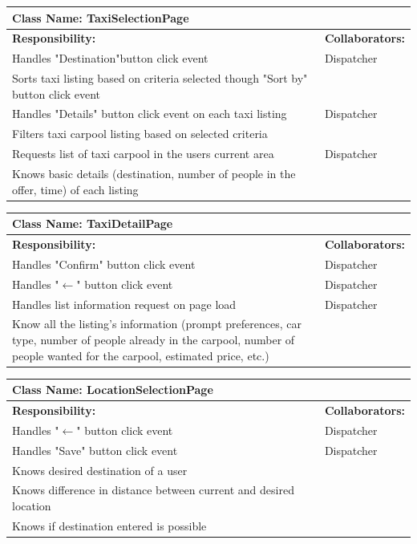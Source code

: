 \documentclass[]{article}
\begin{document}
	\begin{table}[H]
	\centering
	\begin{tabular}{|p{6cm}|p{6cm}|}
	\hline 
		\multicolumn{2}{|l|}{\textbf{Class Name: TaxiSelectionPage}} \\
	\hline
	\textbf{Responsibility:} & \textbf{Collaborators:} \\
	\hline
	Handles "Destination"button click event& Dispatcher \\ \hline
	Sorts taxi listing based on criteria selected though "Sort by" button click event  & \\ \hline
	Handles "Details" button click event  on each taxi listing & Dispatcher \\ \hline
	Filters taxi carpool listing based on selected criteria & \\ \hline
	Requests list of taxi carpool in the users current area & Dispatcher \\ \hline
	Knows basic details (destination, number of people in the offer, time) of each listing & \\ \hline
	\end{tabular}
	\end{table}
	

	\begin{table}[H]
	\centering
	\begin{tabular}{|p{6cm}|p{6cm}|}
	\hline 
		\multicolumn{2}{|l|}{\textbf{Class Name: TaxiDetailPage}} \\
	\hline
	\textbf{Responsibility:} & \textbf{Collaborators:} \\
	\hline
	Handles "Confirm" button click event  & Dispatcher \\ \hline
	Handles "$\xleftarrow{}$" button click event  & Dispatcher \\ \hline
	Handles list information request on page load & Dispatcher\\ \hline
	Know all the listing's information (prompt preferences, car type, number of people already in the carpool, number of people wanted for the carpool, estimated price, etc.)  & \\ \hline
	\end{tabular}
	\end{table}
	
	\begin{table}[H]
	\centering
	\begin{tabular}{|p{6cm}|p{6cm}|}
	\hline 
		\multicolumn{2}{|l|}{\textbf{Class Name: LocationSelectionPage}} \\
	\hline
	\textbf{Responsibility:} & \textbf{Collaborators:} \\
	\hline
	Handles "$\xleftarrow{}$" button click event  & Dispatcher \\ \hline
	Handles "Save" button click event  & Dispatcher\\ \hline
	Knows desired destination of a user & \\ \hline
	Knows difference in distance between current and desired location & \\ \hline
	Knows if destination entered is possible & \\ \hline
	\end{tabular}
	\end{table}
	
\end{document}
